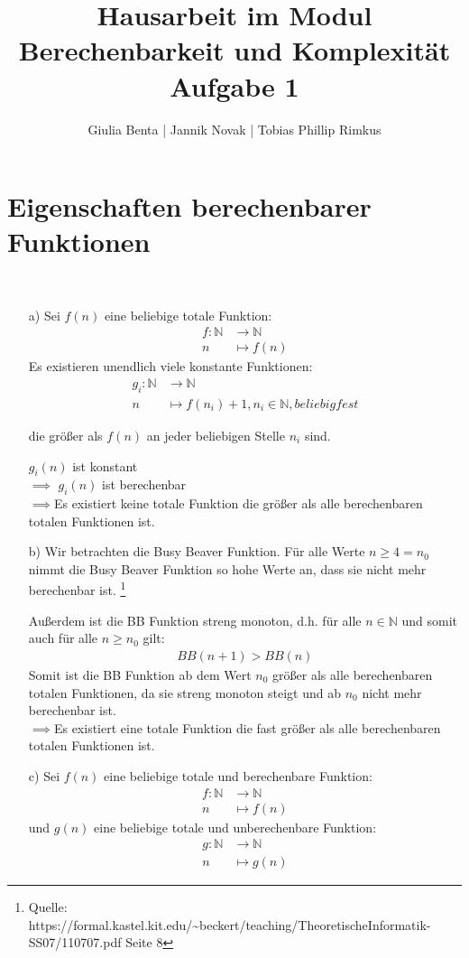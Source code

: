 \documentclass[a4paper,onecolumn,oneside,12pt,ngerman]{article}
\title{Hausarbeit im Modul \glqq Berechenbarkeit und Komplexität\grqq\\
\Large{Aufgabe 1}}
\author{Giulia Benta | Jannik Novak | Tobias Phillip Rimkus} %
\theoremstyle{plain} %
\theoremstyle{definition} %
\theoremstyle{remark} %
\theoremstyle{plain}
\newcommand{\NN}{\mathbb{N}} %
\begin{document}

\maketitle

\section*{Eigenschaften berechenbarer Funktionen}\
\begin{itemize}   
    \item[a)]
    Sei $f(n)$ eine beliebige totale Funktion:
    \begin{align*}
        f : \NN &\to \NN \\
        n &\mapsto f(n)
    \end{align*}
    Es existieren unendlich viele konstante Funktionen:
    \begin{align*}
        g_{i} : \NN &\to \NN \\
        n &\mapsto f(n_{i}) + 1, {n_i} \in \NN, beliebig fest
    \end{align*}

    die größer als $f(n)$ an jeder beliebigen Stelle $n_i$ sind.
    
    $g_{i}(n)$ ist konstant\\$\implies$ $g_{i}(n)$ ist berechenbar\\$\implies$Es existiert keine totale Funktion die größer als alle berechenbaren totalen Funktionen ist.
    
    \item[b)]
Wir betrachten die Busy Beaver Funktion. 
    Für alle Werte $n \geq 4 = n_0$ nimmt die Busy Beaver Funktion so hohe Werte an, dass sie  nicht mehr berechenbar ist. \footnote{Quelle: https://formal.kastel.kit.edu/\~{}beckert/teaching/TheoretischeInformatik-SS07/110707.pdf  Seite 8}
    
    Außerdem ist die BB Funktion streng monoton, d.h. für alle $n \in \NN$ und somit auch für alle $n \geq n_0$ gilt:
    \begin{align*}
        BB(n+1) > BB(n)
    \end{align*}
    Somit ist die BB Funktion ab dem Wert $n_0$ größer als alle berechenbaren totalen Funktionen, da sie streng monoton steigt und ab $n_0$ nicht mehr berechenbar ist.\\$\implies$Es existiert eine totale Funktion die fast größer als alle berechenbaren totalen Funktionen ist.
    \item[c)]
    Sei $f(n)$ eine beliebige totale und berechenbare Funktion:
    \begin{align*}
        f : \NN &\to \NN \\
        n &\mapsto f(n)
    \end{align*}
    und $g(n)$ eine beliebige totale und unberechenbare Funktion:
    \begin{align*}
        g : \NN &\to \NN \\
        n &\mapsto g(n)
    \end{align*}
    

\end{itemize}
\end{document}
